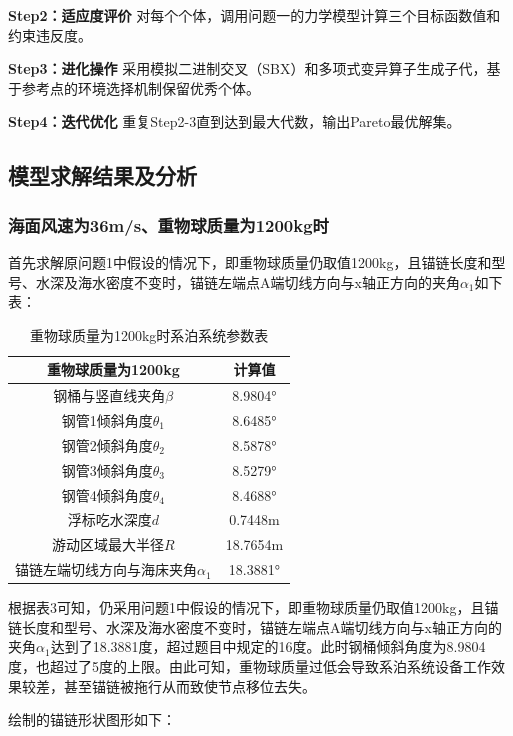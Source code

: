 \documentclass[withoutpreface,bwprint]{cumcmthesis}
\begin{document}
\textbf{Step2：适应度评价}
对每个个体，调用问题一的力学模型计算三个目标函数值和约束违反度。

\textbf{Step3：进化操作}
采用模拟二进制交叉（SBX）和多项式变异算子生成子代，基于参考点的环境选择机制保留优秀个体。

\textbf{Step4：迭代优化}
重复Step2-3直到达到最大代数，输出Pareto最优解集。

\subsection{模型求解结果及分析}

\subsubsection{海面风速为36m/s、重物球质量为1200kg时}
首先求解原问题1中假设的情况下，即重物球质量仍取值1200kg，且锚链长度和型号、水深及海水密度不变时，锚链左端点A端切线方向与x轴正方向的夹角$\alpha_1$如下表：

\begin{table}[H]
\centering
\begin{tabular}{cc}
\toprule
重物球质量为1200kg & 计算值 \\
\midrule
钢桶与竖直线夹角$\beta$ & 8.9804° \\
钢管1倾斜角度$\theta_1$ & 8.6485° \\
钢管2倾斜角度$\theta_2$ & 8.5878° \\
钢管3倾斜角度$\theta_3$ & 8.5279° \\
钢管4倾斜角度$\theta_4$ & 8.4688° \\
浮标吃水深度$d$ & 0.7448m \\
游动区域最大半径$R$ & 18.7654m \\
锚链左端切线方向与海床夹角$\alpha_1$ & 18.3881° \\
\bottomrule
\end{tabular}
\caption{重物球质量为1200kg时系泊系统参数表}
\label{tab:1200kg结果}
\end{table}

根据表3可知，仍采用问题1中假设的情况下，即重物球质量仍取值1200kg，且锚链长度和型号、水深及海水密度不变时，锚链左端点A端切线方向与x轴正方向的夹角$\alpha_1$达到了18.3881度，超过题目中规定的16度。此时钢桶倾斜角度为8.9804度，也超过了5度的上限。由此可知，重物球质量过低会导致系泊系统设备工作效果较差，甚至锚链被拖行从而致使节点移位去失。

绘制的锚链形状图形如下：
\end{document}
